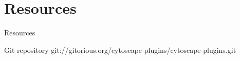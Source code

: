 \section{Resources}
\begin{frame}{Resources}
\begin{block}{Git repository}
git://gitorious.org/cytoscape-plugins/cytoscape-plugins.git
\end{block}
\end{frame}
